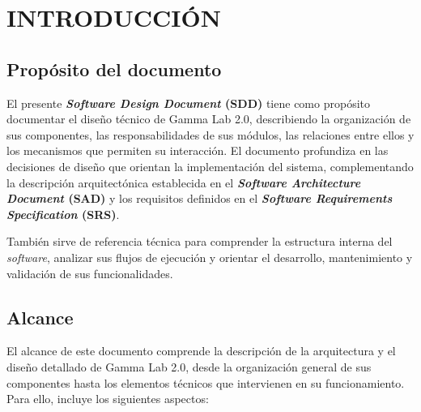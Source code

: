 \documentclass[12pt,letterpaper,oneside]{article}
\DeclareRobustCommand{\_}{\textunderscore\allowbreak}
\begin{document}
\clearpage
{}

\section{INTRODUCCIÓN}

    \subsection{Prop\'osito del documento}
    El presente \textbf{\textit{Software Design Document} (SDD)} tiene como propósito documentar el diseño técnico de Gamma Lab 2.0, describiendo la organización de sus componentes, las responsabilidades de sus módulos, las relaciones entre ellos y los mecanismos que permiten su interacción. El documento profundiza en las decisiones de diseño que orientan la implementación del sistema, complementando la descripción arquitectónica establecida en el \textbf{\textit{Software Architecture Document} (SAD)} y los requisitos definidos en el \textbf{\textit{Software Requirements Specification} (SRS)}.

    También sirve de referencia técnica para comprender la estructura interna del \textit{software}, analizar sus flujos de ejecución y orientar el desarrollo, mantenimiento y validación de sus funcionalidades.

    \subsection{Alcance}
    El alcance de este documento comprende la descripción de la arquitectura y el diseño detallado de Gamma Lab 2.0, desde la organización general de sus componentes hasta los elementos técnicos que intervienen en su funcionamiento. Para ello, incluye los siguientes aspectos:
\end{document}
